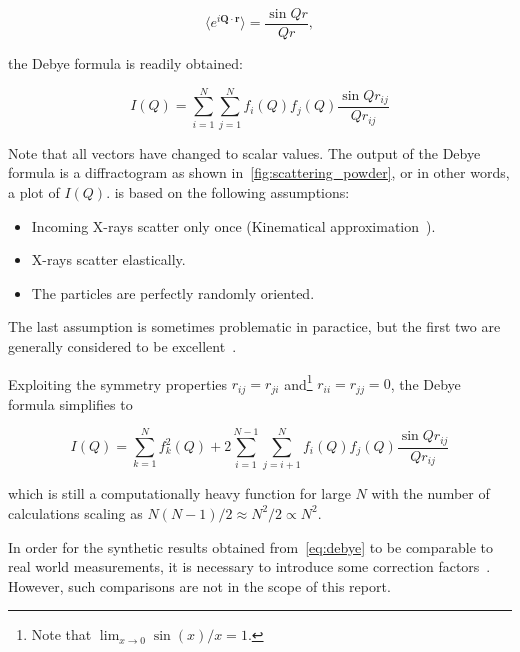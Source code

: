 \documentclass[11pt,twoside]{report}
\begin{document}
\begin{equation}
{\Big\langle e^{i{\mathbf Q}\cdot{\mathbf r}} \Big\rangle  } = \frac{\sin{Qr}}{Qr} ,
\label{eq:debye0}
\end{equation} 

\noindent the Debye formula is readily obtained:

\begin{equation}
I(Q) = \sum_{i=1}^{N}\sum_{j=1}^{N} f_{i}(Q)f_{j}(Q)\frac{\sin{Qr_{ij}}}{Qr_{ij}}
\label{eq:debye1}
\end{equation} 

\noindent Note that all vectors have changed to scalar values. The output of the Debye formula is a diffractogram as shown in~\cref{fig:scattering_powder}, or in other words, a plot of $I(Q)$. 
 is based on the following assumptions:
\begin{itemize}
\item Incoming X-rays scatter only once (Kinematical approximation~\cite{xrayphys}).
\item X-rays scatter elastically.
\item The particles are perfectly randomly oriented.
\end{itemize}

\noindent The last assumption is sometimes problematic in paractice, but the first two are generally considered to be excellent~\cite{xrayphys}.

\indent Exploiting the symmetry properties $r_{ij} = r_{ji}$ and\footnote{Note that $ \lim_{x\to0} \sin(x)/x = 1$.} $r_{ii} = r_{jj} = 0$, the Debye formula simplifies to 

\begin{equation}
\boxed{
I(Q) = \sum_{k=1}^{N}f_{k}^{2}(Q) + 2\sum_{i=1}^{N-1}\sum_{j=i+1}^{N} f_{i}(Q)f_{j}(Q)\frac{\sin{Qr_{ij}}}{Qr_{ij}}} 
\label{eq:debye}
\end{equation} 


\noindent which is still a computationally heavy function for large $N$ with the number of calculations scaling as $N(N-1)/2 \approx N^{2}/2 \propto N^{2}$.

\indent In order for the synthetic results obtained from~\cref{eq:debye} to be comparable to real world measurements, it is necessary to introduce some correction factors~\cite{ springerlink:10.1134/S1063783407010246, xrayphys}. However, such comparisons are not in the scope of this report. %
\end{document}
